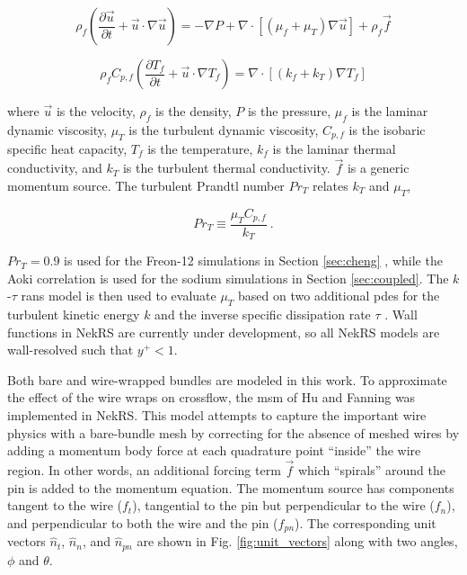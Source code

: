 \documentclass[3p,,preprint,11pt]{elsarticle}
\begin{document}
\begin{equation}
\label{eq:momentum}
\rho_f\left(\frac{\partial\vec{u}}{\partial t}+\vec{u}\cdot\nabla\vec{u}\right)=-\nabla P+\nabla\cdot\left\lbrack\left(\mu_f+\mu_T\right)\nabla\vec{u}\right\rbrack+\rho_f\vec{f}
\end{equation}

\begin{equation}
\label{eq:en}
\rho_fC_{p,f}\left(\frac{\partial T_f}{\partial t}+\vec{u}\cdot\nabla T_f\right)=\nabla\cdot\left\lbrack\left(k_f+k_T\right)\nabla T_f\right\rbrack
\end{equation}

\noindent where $\vec{u}$ is the velocity, $\rho_f$ is the density, $P$ is the pressure, $\mu_f$ is the laminar dynamic viscosity, $\mu_T$ is the turbulent dynamic viscosity, $C_{p,f}$ is the isobaric specific heat capacity, $T_f$ is the temperature, $k_f$ is the laminar thermal conductivity, and $k_T$ is the turbulent thermal conductivity. $\vec{f}$ is a generic momentum source. The turbulent Prandtl number $Pr_T$ relates $k_T$ and $\mu_T$,

\begin{equation}
Pr_T\equiv\frac{\mu_TC_{p,f}}{k_T}\ .
\end{equation}

\noindent $Pr_T=0.9$ is used for the Freon-12 simulations in Section \ref{sec:cheng} \cite{mays}, 
while the Aoki correlation \cite{taler} is used for the sodium simulations in Section \ref{sec:coupled}. The $k$-$\tau$ \gls{rans} model is then used to evaluate $\mu_T$ based on two additional \glspl{pde} for the turbulent kinetic energy $k$ and the inverse specific dissipation rate $\tau$ \cite{kok,thangam}.
Wall functions in NekRS are currently under development, so all NekRS models are wall-resolved such that $y^+<1$. %

Both bare and wire-wrapped bundles are modeled in this work.
To approximate the effect of the wire wraps on crossflow, the \gls{msm}
of Hu and Fanning \cite{hu2013} was implemented in NekRS. This model attempts to capture the important wire physics with a bare-bundle mesh by correcting for the absence of meshed wires by adding a momentum body force at each quadrature point ``inside'' the wire region. In other words, an additional forcing term $\vec{f}$ which ``spirals'' around the pin is added to the momentum equation. The momentum source has components
tangent to the wire ($f_t$), tangential to the pin but perpendicular to the wire ($f_n$), and perpendicular to both the wire and the pin ($f_{pn}$). The corresponding unit vectors $\hat{n}_t$, $\hat{n}_n$, and $\hat{n}_{pn}$ are shown in Fig. \ref{fig:unit_vectors} along with two angles, $\phi$ and $\theta$. 
\end{document}
